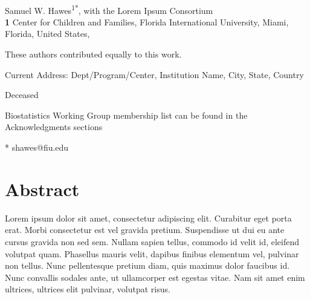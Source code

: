 \documentclass[
  10pt,
  letterpaper,
]{article}
\begin{document}
\vspace*{0.2in}

\begin{flushleft}
{\Large
\textbf{} %
}
\newline
\\
Samuel W. Hawes\textsuperscript{1*}, with the Lorem Ipsum
Consortium\textsuperscript{\textpilcrow}
\\
\bigskip
\textbf{1} Center for Children and Families, Florida International
University, Miami, Florida, United States, 
\bigskip

% 
%
\Yinyang These authors contributed equally to this work.


\textcurrency Current Address: Dept/Program/Center, Institution Name, City, State, Country %

\dag Deceased

\textpilcrow Biostatistics Working Group membership list can be found in
the Acknowledgments sections

* shawes@fiu.edu

\end{flushleft}

\section*{Abstract}
Lorem ipsum dolor sit amet, consectetur adipiscing elit. Curabitur eget
porta erat. Morbi consectetur est vel gravida pretium. Suspendisse ut
dui eu ante cursus gravida non sed sem. Nullam sapien tellus, commodo id
velit id, eleifend volutpat quam. Phasellus mauris velit, dapibus
finibus elementum vel, pulvinar non tellus. Nunc pellentesque pretium
diam, quis maximus dolor faucibus id. Nunc convallis sodales ante, ut
ullamcorper est egestas vitae. Nam sit amet enim ultrices, ultrices elit
pulvinar, volutpat risus.
\end{document}
